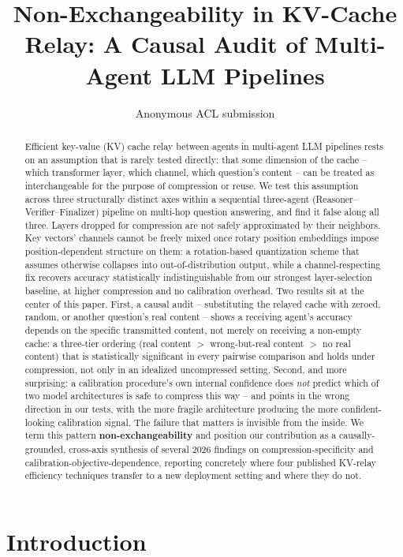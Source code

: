 \documentclass[11pt]{article}
\title{Non-Exchangeability in KV-Cache Relay: A Causal Audit of Multi-Agent LLM Pipelines}
\author{Anonymous ACL submission}
\begin{document}
\maketitle

\begin{abstract}
Efficient key-value (KV) cache relay between agents in multi-agent LLM
pipelines rests on an assumption that is rarely tested directly: that some
dimension of the cache -- which transformer layer, which channel, which
question's content -- can be treated as interchangeable for the purpose of
compression or reuse. We test this assumption across three structurally
distinct axes within a sequential three-agent (Reasoner--Verifier--Finalizer)
pipeline on multi-hop question answering, and find it false along all
three. Layers dropped for compression are not safely approximated by their
neighbors. Key vectors' channels cannot be freely mixed once rotary
position embeddings impose position-dependent structure on them: a
rotation-based quantization scheme that assumes otherwise collapses into
out-of-distribution output, while a channel-respecting fix recovers
accuracy statistically indistinguishable from our strongest layer-selection
baseline, at higher compression and no calibration overhead. Two
results sit at the center of this paper. First, a causal audit --
substituting the relayed cache with zeroed, random, or another question's
real content -- shows a receiving agent's accuracy depends on the specific
transmitted content, not merely on receiving a non-empty cache: a
three-tier ordering (real content $>$ wrong-but-real content $>$ no real
content) that is statistically significant in every pairwise comparison and
holds under compression, not only in an idealized uncompressed setting.
Second, and more surprising: a calibration procedure's own internal
confidence does \emph{not} predict which of two model architectures is
safe to compress this way -- and points in the wrong direction in our
tests, with the more fragile architecture producing the more
confident-looking calibration signal. The failure that matters is
invisible from the inside. We term this pattern \textbf{non-exchangeability}
and position our contribution as a causally-grounded, cross-axis synthesis
of several 2026 findings on compression-specificity and
calibration-objective-dependence, reporting concretely where four
published KV-relay efficiency techniques transfer to a new deployment
setting and where they do not.
\end{abstract}

\section{Introduction}
\end{document}
